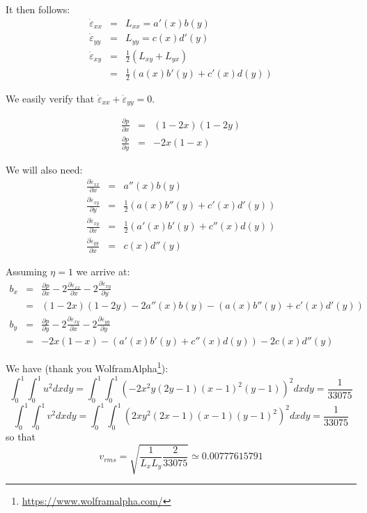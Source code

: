 It then follows:
\begin{eqnarray}
\dot{\varepsilon}_{xx} &=& L_{xx} = a'(x) b(y) \\
\dot{\varepsilon}_{yy} &=& L_{yy} = c(x) d'(y) \\
\dot{\varepsilon}_{xy} 
&=& \frac{1}{2} (L_{xy}+L_{yx}) \\
&=& \frac{1}{2} ( a(x) b'(y) +  c'(x) d(y)   ) 
\end{eqnarray}

We easily verify that $\dot{\varepsilon}_{xx}+\dot{\varepsilon}_{yy}=0$.

\begin{eqnarray}
\frac{\partial p}{\partial x} &=& (1-2x)(1-2y)\\
\frac{\partial p}{\partial y} &=& -2 x(1-x) 
\end{eqnarray}

We will also need:
\begin{eqnarray}
\frac{\partial \dot{\varepsilon}_{xx}}{\partial x}  &=& a''(x) b(y) \\
\frac{\partial \dot{\varepsilon}_{xy}}{\partial y}  &=& \frac{1}{2} ( a(x) b''(y) +  c'(x) d'(y)   )\\
\frac{\partial \dot{\varepsilon}_{xy}}{\partial x}  &=& \frac{1}{2} ( a'(x) b'(y) +  c''(x) d(y)   ) \\
\frac{\partial \dot{\varepsilon}_{yy}}{\partial x}  &=& c(x) d''(y)
\end{eqnarray}

Assuming $\eta=1$ we arrive at:
\begin{eqnarray}
b_x 
&=&  \frac{\partial p}{\partial x} 
-2\frac{\partial \dot{\varepsilon}_{xx}}{\partial x}  
-2\frac{\partial \dot{\varepsilon}_{xy}}{\partial y}  \\
&=&  (1-2x)(1-2y) - 2a''(x) b(y) - ( a(x) b''(y) +  c'(x) d'(y)   ) \\
b_y 
&=&  \frac{\partial p}{\partial y}  
-2\frac{\partial \dot{\varepsilon}_{xy}}{\partial x} 
-2\frac{\partial \dot{\varepsilon}_{yy}}{\partial y} \\
&=& -2 x(1-x) - ( a'(x) b'(y) +  c''(x) d(y)   ) -2  c(x) d''(y)
\end{eqnarray}

We have (thank you WolframAlpha\footnote{\url{https://www.wolframalpha.com/}}):
\[
\int_{0}^{1}\int_{0}^{1} u^2 dxdy= 
\int_{0}^{1}\int_{0}^{1} 
( -2x^2y(2y-1)(x-1)^2(y-1) )^2 
dxdy = \frac{1}{33075}
\]
\[
\int_{0}^{1}\int_{0}^{1} v^2 dxdy= 
\int_{0}^{1}\int_{0}^{1} 
( 2xy^2(2x-1)(x-1)(y-1)^2 )^2
dxdy = \frac{1}{33075}
\]
so that
\[
v_{rms} = \sqrt{\frac{1}{L_xL_y} \frac{2}{33075}  }
\simeq 0.00777615791
\]

